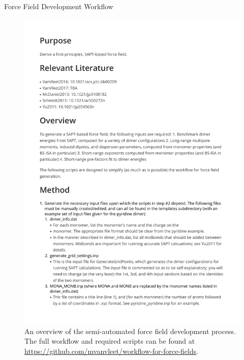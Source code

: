 \begin{chapter}{Force Field Development Workflow}
\begin{figure}
\includegraphics[page=3,width=1.0\textwidth]{workflow/github_readme.pdf}
\caption[The Semi-Automated Workflow for Force Field Development]{An overview
of the semi-automated force field
development process. The full workflow and required scripts can be found at
\url{https://github.com/mvanvleet/workflow-for-force-fields}.}
%
\label{fig:workflow-overview}
\end{figure}

\end{chapter}

\clearpage

